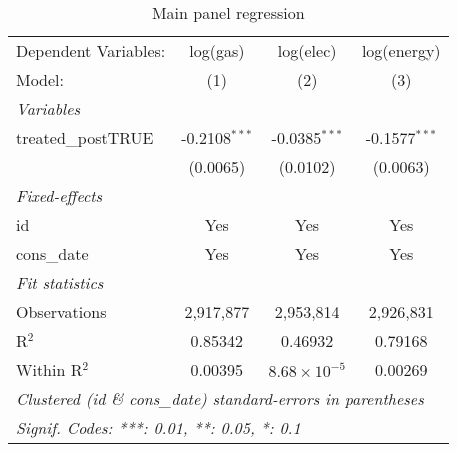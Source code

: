 
\begin{table}[htbp]
   \caption{Main panel regression\label{tab:maintwfe}}
   \centering
   \begin{tabular}{lccc}
      \tabularnewline \midrule \midrule
      Dependent Variables: & log(gas)        & log(elec)             & log(energy)\\  
      Model:               & (1)             & (2)                   & (3)\\  
      \midrule
      \emph{Variables}\\
      treated\_postTRUE    & -0.2108$^{***}$ & -0.0385$^{***}$       & -0.1577$^{***}$\\   
                           & (0.0065)        & (0.0102)              & (0.0063)\\   
      \midrule
      \emph{Fixed-effects}\\
      id                   & Yes             & Yes                   & Yes\\  
      cons\_date           & Yes             & Yes                   & Yes\\  
      \midrule
      \emph{Fit statistics}\\
      Observations         & 2,917,877       & 2,953,814             & 2,926,831\\  
      R$^2$                & 0.85342         & 0.46932               & 0.79168\\  
      Within R$^2$         & 0.00395         & $8.68\times 10^{-5}$  & 0.00269\\  
      \midrule \midrule
      \multicolumn{4}{l}{\emph{Clustered (id \& cons\_date) standard-errors in parentheses}}\\
      \multicolumn{4}{l}{\emph{Signif. Codes: ***: 0.01, **: 0.05, *: 0.1}}\\
   \end{tabular}
\end{table}



